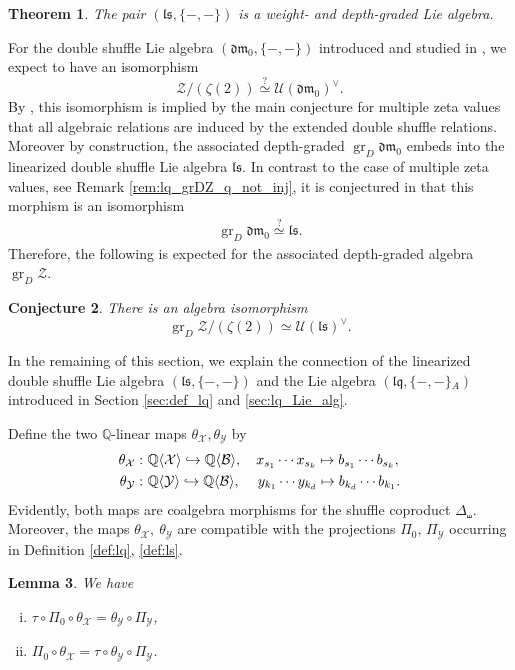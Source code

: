 \documentclass[12pt,reqno]{amsart}
\newtheorem{thm}{Theorem}[section]
\newtheorem{lem}[thm]{Lemma}
\newtheorem{con}[thm]{Conjecture}
\numberwithin{equation}{section}
\theoremstyle{definition}
\newcommand{\QQ}{\mathbb{Q}}
\newcommand{\Z}{\mathcal{Z}}
\newcommand{\grDZ}{\operatorname{gr}_D\Z}
\newcommand{\grD}{\operatorname{gr}_D}
\newcommand{\B}{\mathcal{B}}
\newcommand{\QB}{\QQ\langle \B\rangle}
\newcommand{\X}{\mathcal{X}}
\newcommand{\QX}{\QQ\langle \X\rangle}
\newcommand{\Y}{\mathcal{Y}}
\newcommand{\QY}{\QQ\langle \Y\rangle}
\newcommand{\ls}{\mathfrak{ls}}
\newcommand{\dm}{\mathfrak{dm}_0}
\newcommand{\lqq}{\mathfrak{lq}}
\newcommand{\ariemp}{\{-,-\}\!_A}
\newcommand{\shco}{\Delta_{\shuffle}}
\newcommand{\pizero}{\Pi_0}
\newcommand{\piY}{\Pi_\Y}
\newcommand{\thetaX}{\theta_\X}
\newcommand{\thetaY}{\theta_\Y}
\begin{document}
\begin{thm} \cite[Theorem 5.5]{Bro21} The pair $(\ls,\{-,-\})$ is a weight- and depth-graded Lie algebra.
\end{thm}

For the double shuffle Lie algebra $(\dm,\{-,-\})$ introduced and studied in \cite{Ra00}, we expect to have an isomorphism
\[\Z/(\zeta(2))\overset{?}{\simeq} \mathcal{U}(\dm)^\vee.\] 
By \cite{Ra00}, this isomorphism is implied by the main conjecture for multiple zeta values that all algebraic relations are induced by the extended double shuffle relations.
Moreover by construction, the associated depth-graded $\grD \dm$ embeds into the linearized double shuffle Lie algebra $\ls$. In contrast to the case of multiple zeta values, see Remark \ref{rem:lq_grDZ_q_not_inj}, it is conjectured in \cite{IKZ06} that this morphism is an isomorphism
\begin{align} \label{eq:grDdm0_ls_iso}
\grD \dm \overset{?}{\simeq} \ls.
\end{align}
Therefore, the following is expected for the associated depth-graded algebra $\grDZ$.

\begin{con} \label{conj:mzv_depthgraded_iso} There is an algebra isomorphism
\[\grDZ/(\zeta(2))\simeq \mathcal{U}(\ls)^\vee.\]
\end{con}

In the remaining of this section, we explain the connection of the linearized double shuffle Lie algebra $(\ls,\{-,-\})$ and the Lie algebra $(\lqq,\ariemp)$ introduced in Section \ref{sec:def_lq} and \ref{sec:lq_Lie_alg}.

Define the two $\QQ$-linear maps $\theta_\X,\theta_\Y$ by
\begin{align}
\label{eq:thetaX}
\thetaX:&\ \QX\hookrightarrow \QB, \quad x_{s_1}\cdots x_{s_k} \mapsto b_{s_1}\cdots b_{s_k}, \\
\label{eq:thetaY}
\thetaY:&\ \QY\hookrightarrow \QB, \quad \hspace{0.08cm} y_{k_1}\cdots y_{k_d} \mapsto b_{k_d}\cdots b_{k_1}.
\end{align}
Evidently, both maps are coalgebra morphisms for the shuffle coproduct $\shco$. Moreover, the maps $\thetaX,\ \thetaY$ are compatible with the projections $\pizero$, $\piY$ occurring in Definition \ref{def:lq}, \ref{def:ls}.

\begin{lem} \label{lem:thetas_proj} We have
\begin{enumerate}[(i)]
\item $\tau\circ \pizero\circ \thetaX=\thetaY\circ \piY$,
\item $\pizero\circ \thetaX=\tau\circ\thetaY\circ \piY$.
\end{enumerate}
\end{lem}
\end{document}
